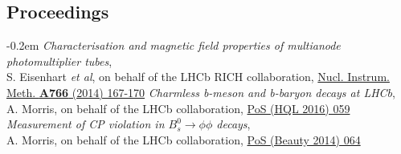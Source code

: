 \documentclass[contbibnum,titleabove]{simplecv}
\begin{document}
	\subsection{Proceedings}
	\vspace{-0.5em}
	\begin{thebibliography}{2}
		\itemsep-0.2em
		\textit{Characterisation and magnetic field properties of multianode photomultiplier tubes},\\S. Eisenhart \textit{et al}, on behalf of the LHCb RICH collaboration, \href{http://dx.doi.org/10.1016/j.nima.2014.05.036}{Nucl. Instrum. Meth. \textbf{A766} (2014) 167-170}
		\textit{Charmless b-meson and b-baryon decays at LHCb},\\A. Morris, on behalf of the LHCb collaboration, \href{https://pos.sissa.it/cgi-bin/reader/contribution.cgi?id=274/059}{PoS (HQL 2016) 059}
		\textit{Measurement of CP violation in $B^0_s \to \phi\phi$ decays},\\A. Morris, on behalf of the LHCb collaboration, \href{https://pos.sissa.it/cgi-bin/reader/contribution.cgi?id=216/064}{PoS (Beauty 2014) 064}
	\end{thebibliography}
\end{document}
